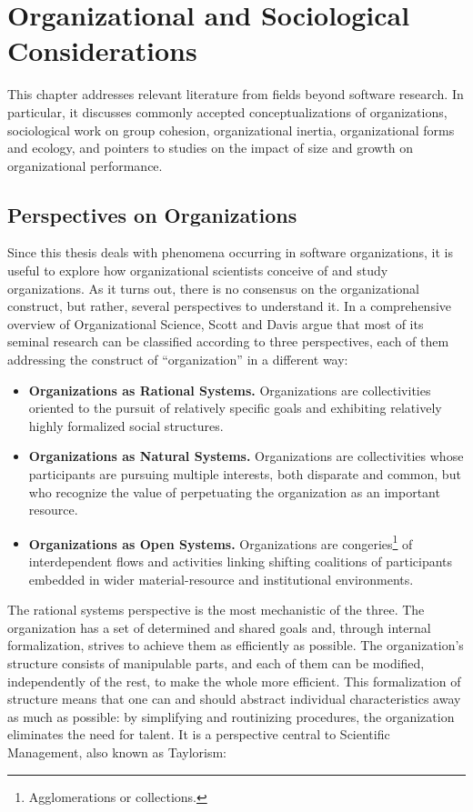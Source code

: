 \chapter{Organizational and Sociological Considerations}

This chapter addresses relevant literature from fields beyond software research. In particular, it discusses commonly accepted conceptualizations of organizations, sociological work on group cohesion, organizational inertia, organizational forms and ecology, and pointers to studies on the impact of size and growth on organizational performance.

\section{Perspectives on Organizations}

Since this thesis deals with phenomena occurring in software organizations, it is useful to explore how organizational scientists conceive of and study organizations. As it turns out, there is no consensus on the organizational construct, but rather, several perspectives to understand it. In a comprehensive overview of Organizational Science, Scott and Davis  argue that most of its seminal research can be classified according to three perspectives, each of them addressing the construct of ``organization'' in a different way:

\begin{itemize}
\item \textbf{Organizations as Rational Systems.} Organizations are collectivities oriented to the pursuit of relatively specific goals and exhibiting relatively highly formalized social structures.

\item \textbf{Organizations as Natural Systems.} Organizations are collectivities whose participants are pursuing multiple interests, both disparate and common, but who recognize the value of perpetuating the organization as an important resource.

\item \textbf{Organizations as Open Systems.} Organizations are congeries\footnote{Agglomerations or collections.} of interdependent flows and activities linking shifting coalitions of participants embedded in wider material-resource and institutional environments.
\end{itemize}

The rational systems perspective is the most mechanistic of the three. The organization has a set of determined and shared goals and, through internal formalization, strives to achieve them as efficiently as possible. The organization's structure consists of manipulable parts, and each of them can be modified, independently of the rest, to make the whole more efficient. This formalization of structure means that one can and should abstract individual characteristics away as much as possible: by simplifying and routinizing procedures, the organization eliminates the need for talent. It is a perspective central to Scientific Management, also known as Taylorism:

